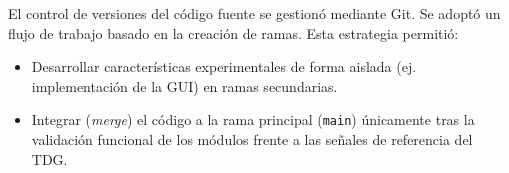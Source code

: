 El control de versiones del código fuente se gestionó mediante Git. Se adoptó un flujo de trabajo basado en la creación de ramas. Esta estrategia permitió:

\begin{itemize}
    \item Desarrollar características experimentales de forma aislada (ej. implementación de la GUI) en ramas secundarias.
    \item Integrar (\textit{merge}) el código a la rama principal (\texttt{main}) únicamente tras la validación funcional de los módulos frente a las señales de referencia del TDG.
\end{itemize}

